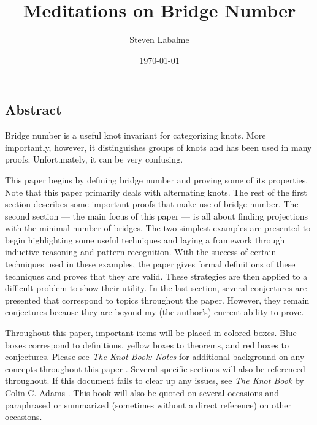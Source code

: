 \documentclass[titlepage]{article}
\title{Meditations on Bridge Number}
\author{Steven Labalme}
\date{\today}
\begin{document}
\maketitle



\tableofcontents
\listoffigures
\listoftables
\newpage



\pagestyle{fancy}
\fancyhf{}
\renewcommand{\headrulewidth}{0pt}
\setcounter{secnumdepth}{0}
\begin{center}
    \section{Abstract}
\end{center}
Bridge number is a useful knot invariant for categorizing knots. More importantly, however, it distinguishes groups of knots and has been used in many proofs. Unfortunately, it can be very confusing.\par
This paper begins by defining bridge number and proving some of its properties. Note that this paper primarily deals with alternating knots. The rest of the first section describes some important proofs that make use of bridge number. The second section --- the main focus of this paper --- is all about finding projections with the minimal number of bridges. The two simplest examples are presented to begin highlighting some useful techniques and laying a framework through inductive reasoning and pattern recognition. With the success of certain techniques used in these examples, the paper gives formal definitions of these techniques and proves that they are valid. These strategies are then applied to a difficult problem to show their utility. In the last section, several conjectures are presented that correspond to topics throughout the paper. However, they remain conjectures because they are beyond my (the author's) current ability to prove.\par
Throughout this paper, important items will be placed in colored boxes. Blue boxes correspond to definitions, yellow boxes to theorems, and red boxes to conjectures. Please see \emph{The Knot Book: Notes} for additional background on any concepts throughout this paper \cite{bib:knotnotes}. Several specific sections will also be referenced throughout. If this document fails to clear up any issues, see \emph{The Knot Book} by Colin C. Adams \cite{bib:knotbook}. This book will also be quoted on several occasions and paraphrased or summarized (sometimes without a direct reference) on other occasions.
\newpage
\end{document}
